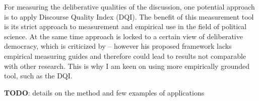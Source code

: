 \documentclass[journal,a4paper]{IEEEtran}
\begin{document}
For measuring the deliberative qualities of the discussion, one potential approach is to apply  Discourse Quality Index (DQI). The benefit of this measurement tool is its strict approach to measurement and empirical use in the field of political science. At the same time  approach is locked to a certain view of deliberative democracy, which is criticized by  -- however his proposed framework lacks empirical measuring guides and therefore could lead to results not comparable with other research. This is why I am keen on using more empirically grounded tool, such as the DQI.

\textbf{TODO}: details on the method and few examples of applications



\end{document}
